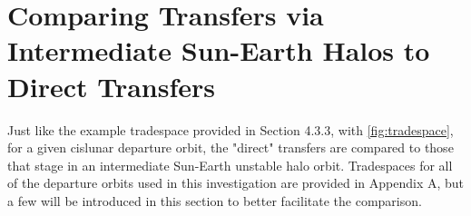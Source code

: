 \section{Comparing Transfers via Intermediate Sun-Earth Halos to Direct Transfers}
Just like the example tradespace provided in Section 4.3.3, with \cref{fig:tradespace}, for a given
cislunar departure orbit, the "direct" transfers are compared to those that stage in an
intermediate Sun-Earth unstable halo orbit. Tradespaces for all of the departure orbits used in
this investigation are provided in Appendix A, but a few will be introduced in this section to
better facilitate the comparison.
